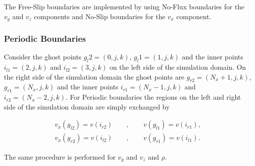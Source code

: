 The Free-Slip boundaries are implemented by using No-Flux boundaries for
the $v_y$ and $v_z$ components and No-Slip boundaries for the $v_x$ component.

\subsubsection{Periodic Boundaries}

Consider the ghost points $g_l2=(0, j, k)$, $g_l1=(1, j, k)$ and the inner points $i_{l1}=(2, j, k)$ and $i_{l2}=(3, j, k)$ on the left side of
the simulation domain.
On the right side of the simulation domain the ghost points are $g_{r2}=(N_x+1, j, k)$, $g_{r1}=(N_x, j, k)$
and the inner points $i_{r1}=(N_x-1, j, k)$ and $i_{r2}=(N_x - 2, j, k)$.
For Periodic boundaries the regions on the left and right side of the simulation domain are simply exchanged by

\begin{align}
    v_x(g_{l2}) = v(i_{r2}) \qquad , \qquad v(g_{l1}) = v(i_{r1}),\\
    v_x(g_{r2}) = v(i_{l2}) \qquad , \qquad v(g_{r1}) = v(i_{l1}).
\end{align}

The same procedure is performed for $v_y$ and $v_z$ and $\rho$.

%
%



